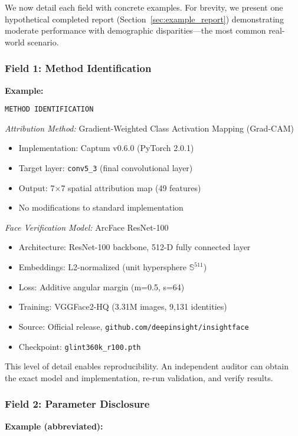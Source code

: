 We now detail each field with concrete examples. For brevity, we present one hypothetical completed report (Section~\ref{sec:example_report}) demonstrating moderate performance with demographic disparities—the most common real-world scenario.

\subsubsection{Field 1: Method Identification}

\textbf{Example:}

\texttt{METHOD IDENTIFICATION}

\textit{Attribution Method:} Gradient-Weighted Class Activation Mapping (Grad-CAM)~\cite{selvaraju2017grad}
\begin{itemize}
\item Implementation: Captum v0.6.0 (PyTorch 2.0.1)
\item Target layer: \texttt{conv5\_3} (final convolutional layer)
\item Output: 7$\times$7 spatial attribution map (49 features)
\item No modifications to standard implementation
\end{itemize}

\textit{Face Verification Model:} ArcFace ResNet-100~\cite{deng2019arcface}
\begin{itemize}
\item Architecture: ResNet-100 backbone, 512-D fully connected layer
\item Embeddings: L2-normalized (unit hypersphere $\mathbb{S}^{511}$)
\item Loss: Additive angular margin (m=0.5, s=64)
\item Training: VGGFace2-HQ (3.31M images, 9,131 identities)
\item Source: Official release, \texttt{github.com/deepinsight/insightface}
\item Checkpoint: \texttt{glint360k\_r100.pth}
\end{itemize}

This level of detail enables reproducibility. An independent auditor can obtain the exact model and implementation, re-run validation, and verify results.

\subsubsection{Field 2: Parameter Disclosure}

\textbf{Example (abbreviated):}

